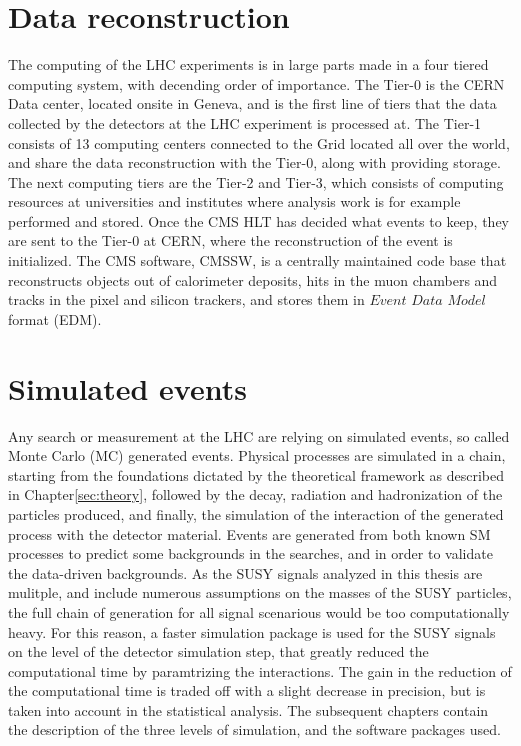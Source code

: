 \section{Data reconstruction}
The computing of the LHC experiments is in large parts made in a four tiered computing system, with decending order of importance. 
The Tier-0 is the CERN Data center, located onsite in Geneva, and is the first line of tiers that the data collected by the detectors at the LHC experiment is processed at. 
The Tier-1 consists of 13 computing centers connected to the Grid located all over the world, and share the data reconstruction with the Tier-0, along with providing storage.
The next computing tiers are the Tier-2 and Tier-3, which consists of computing resources at universities and institutes where analysis work is for example performed and stored. 
Once the CMS HLT has decided what events to keep, they are sent to the Tier-0 at CERN, where the reconstruction of the event is initialized. 
The CMS software, CMSSW, is a centrally maintained code base that reconstructs objects out of calorimeter deposits, hits in the muon chambers and tracks in the pixel and silicon trackers, and stores them in $Event$ $Data$ $Model$ format (EDM).    
\section{Simulated events}\label{sec:MC}
Any search or measurement at the LHC are relying on simulated events, so called Monte Carlo (MC) generated events. 
Physical processes are simulated in a chain, starting from the foundations dictated by the theoretical framework as described in Chapter\ref{sec:theory}, followed by the decay, radiation and hadronization of the particles produced, and finally, the simulation of the interaction of the generated process with the detector material. 
Events are generated from both known SM processes to predict some backgrounds in the searches, and in order to validate the data-driven backgrounds. 
As the SUSY signals analyzed in this thesis are mulitple, and include numerous assumptions on the masses of the SUSY particles, the full chain of generation for all signal scenarious would be too computationally heavy. 
For this reason, a faster simulation package is used for the SUSY signals on the level of the detector simulation step, that greatly reduced the computational time by paramtrizing the interactions. 
The gain in the reduction of the computational time is traded off with a slight decrease in precision, but is taken into account in the statistical analysis. 
The subsequent chapters contain the description of the three levels of simulation, and the software packages used. 
